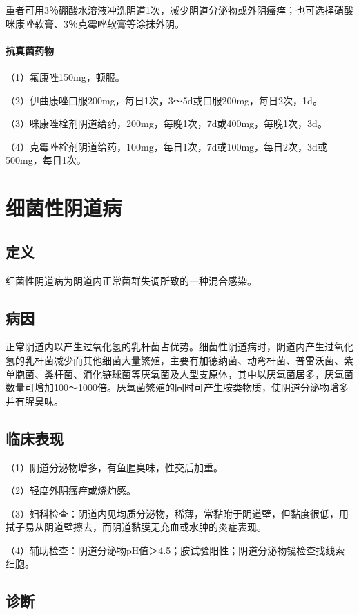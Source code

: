重者可用3％硼酸水溶液冲洗阴道1次，减少阴道分泌物或外阴瘙痒；也可选择硝酸咪康唑软膏、3％克霉唑软膏等涂抹外阴。
\paragraph{ 抗真菌药物}

（1）氟康唑150mg，顿服。

（2）伊曲康唑口服200mg，每日1次，3～5d或口服200mg，每日2次，1d。

（3）咪康唑栓剂阴道给药，200mg，每晚1次，7d或400mg，每晚1次，3d。

（4）克霉唑栓剂阴道给药，100mg，每日1次，7d或100mg，每日2次，3d或500mg，每日1次。

\section{细菌性阴道病}

\subsection{定义}

细菌性阴道病为阴道内正常菌群失调所致的一种混合感染。

\subsection{病因}

正常阴道内以产生过氧化氢的乳杆菌占优势。细菌性阴道病时，阴道内产生过氧化氢的乳杆菌减少而其他细菌大量繁殖，主要有加德纳菌、动弯杆菌、普雷沃菌、紫单胞菌、类杆菌、消化链球菌等厌氧菌及人型支原体，其中以厌氧菌居多，厌氧菌数量可增加100～1000倍。厌氧菌繁殖的同时可产生胺类物质，使阴道分泌物增多并有腥臭味。

\subsection{临床表现}

（1）阴道分泌物增多，有鱼腥臭味，性交后加重。

（2）轻度外阴瘙痒或烧灼感。

（3）妇科检查：阴道内见均质分泌物，稀薄，常黏附于阴道壁，但黏度很低，用拭子易从阴道壁擦去，而阴道黏膜无充血或水肿的炎症表现。

（4）辅助检查：阴道分泌物pH值＞4.5；胺试验阳性；阴道分泌物镜检查找线索细胞。

\subsection{诊断}

